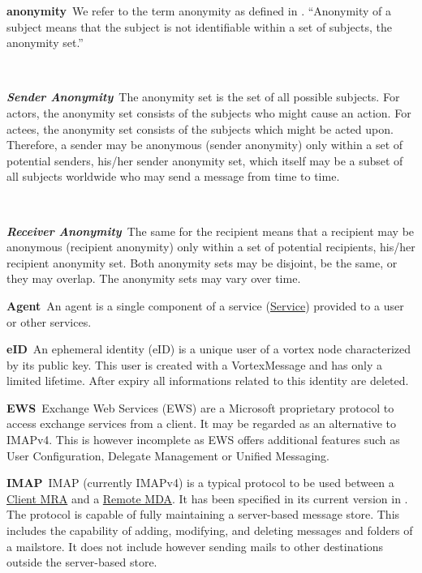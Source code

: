 \documentclass[a4paper,appendixprefix,pdfusetitle,twocolumn,fontsize=8pt,DIV=calc,8pt,draft]{\doctype} %
\newenvironment{entry}{\par\leavevmode\hangpara{1.5mm}{1}\ignorespaces}{\RaggedRight\par}
\newcommand*{\mainentry}[2]{{\bfseries{#1\label{def:#1}}}~#2\par}
\newcommand*{\subentry}[2]{\par~\begin{minipage}{\columnwidth-0.6cm}{\bfseries{\itshape{#1\label{def:#1}}}}~#2\end{minipage}}
\newcommand*{\defref}[1]{\hyperref[def:#1]{#1}}
\begin{document}
\begin{entry}
	\mainentry{anonymity}{We refer to the term anonymity as defined in \cite{anonTerminology}. ``Anonymity of a subject means that the subject is not identifiable within a set of subjects, the anonymity set.''\omitted}
	\subentry{Sender Anonymity}{The anonymity set is the set of all possible subjects. For actors, the anonymity set consists of the subjects who might cause an action. For actees, the anonymity set consists of the subjects which might be acted upon. Therefore, a sender may be anonymous (sender anonymity) only within a set of potential senders, his/her sender anonymity set, which itself may be a subset of all subjects worldwide who may send a message from time to time.}
	\subentry{Receiver Anonymity}{The same for the recipient means that a recipient may be anonymous (recipient anonymity) only within a set of potential recipients, his/her recipient anonymity set. Both anonymity sets may be disjoint, be the same, or they may overlap. The anonymity sets may vary over time.}
\end{entry}

\begin{entry}
	\mainentry{Agent}{An agent is a single component of a service (\defref{Service}) provided to a user or other services.}
\end{entry}

\begin{entry}
	\mainentry{eID}{An ephemeral identity (eID) is a unique user of a vortex node characterized by its public key. This user is created with a VortexMessage and has only a limited lifetime. After expiry all informations related to this identity are deleted.}
\end{entry}

\begin{entry}
	\mainentry{EWS}{Exchange Web Services (EWS) are a Microsoft proprietary protocol to access exchange services from a client. It may be regarded as an alternative to IMAPv4. This is however incomplete as EWS offers additional features such as User Configuration, Delegate Management or Unified Messaging.}
\end{entry}

\begin{entry}
	\mainentry{IMAP}{IMAP (currently IMAPv4) is a typical protocol to be used between a \defref{Client MRA} and a \defref{Remote MDA}. It has been specified in its current version in \cite{RFC3501}. The protocol is capable of fully maintaining a server-based message store. This includes the capability of adding, modifying, and deleting messages and folders of a mailstore. It does not include however sending mails to other destinations outside the server-based store.}
\end{entry}
\end{document}
